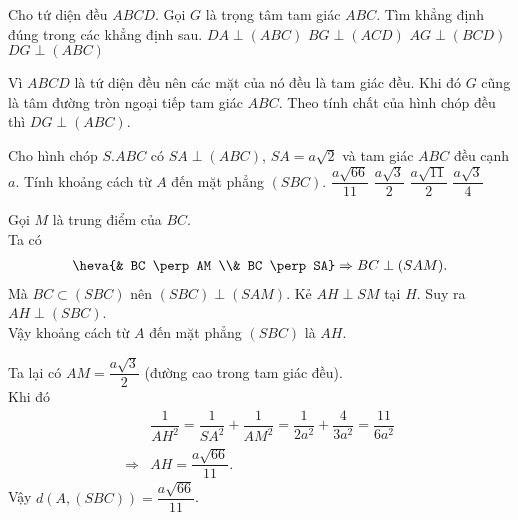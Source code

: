 \begin{ex}%
 Cho tứ diện đều $ABCD$. Gọi $G$ là trọng tâm tam giác $ABC$. Tìm khẳng định đúng trong các khẳng định sau.
 \choice
  {$DA \perp (ABC)$}
  {$BG \perp (ACD)$}
  {$AG \perp (BCD)$}
  {\True $DG \perp (ABC)$}
 \loigiai
  {
  \immini
  {
  Vì $ABCD$ là tứ diện đều nên các mặt của nó đều là tam giác đều. Khi đó $G$ cũng là tâm đường tròn ngoại tiếp tam giác $ABC$.
  Theo tính chất của hình chóp đều thì $DG \perp (ABC)$.
  }
  {
  }
  }
\end{ex}

\begin{ex}%
 Cho hình chóp $S.ABC$ có $SA \perp (ABC)$, $SA = a\sqrt{2}$ và tam giác $ABC$ đều cạnh $a$. Tính khoảng cách từ $A$ đến mặt phẳng $(SBC)$.
 \choice
  {\True $\dfrac{a \sqrt{66}}{11}$}
  {$\dfrac{a \sqrt{3}}{2}$}
  {$\dfrac{a \sqrt{11}}{2}$}
  {$\dfrac{a \sqrt{3}}{4}$}
 \loigiai
  {
  \immini
  {
  Gọi $M$ là trung điểm của $BC$.\\
  Ta có
  \begin{align*}
   \heva{& BC \perp AM \\& BC \perp SA} \Rightarrow BC \perp (SAM).
  \end{align*}
  Mà $BC \subset (SBC)$ nên $(SBC) \perp (SAM)$.
  Kẻ $AH \perp SM$ tại $H$. Suy ra $AH \perp (SBC)$.\\
  Vậy khoảng cách từ $A$ đến mặt phẳng $(SBC)$ là $AH$.\\
  }
  {
  }
  \noindent
  Ta lại có $AM = \dfrac{a \sqrt{3}}{2}$ (đường cao trong tam giác đều).\\
  Khi đó
  \begin{align*}
   & \dfrac{1}{AH^2} = \dfrac{1}{SA^2} + \dfrac{1}{AM^2} = \dfrac{1}{2a^2} + \dfrac{4}{3a^2} = \dfrac{11}{6a^2}\\
   \Rightarrow & AH = \dfrac{a \sqrt{66}}{11}.
  \end{align*}
  Vậy $d(A, (SBC)) = \dfrac{a \sqrt{66}}{11}$.
  }
\end{ex}

